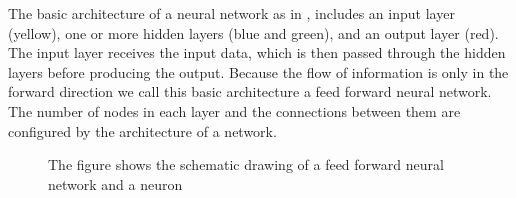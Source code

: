 The basic architecture of a neural network as in ,  includes an input layer (yellow), one or more hidden layers (blue and green), and an output layer (red). The input layer receives the input data, which is then passed through the hidden layers before producing the output. Because the flow of information is only in the forward direction we call this basic architecture a feed forward neural network. The number of nodes in each layer and the connections between them are configured by the architecture of a network.
\begin{figure}
    \begin{center}
        \hfill
    \end{center}
    \caption[neural network and neuron schema]{The figure shows the schematic drawing of a feed forward neural network and a neuron}
    \label{fig:neural_architecture}
\end{figure}

